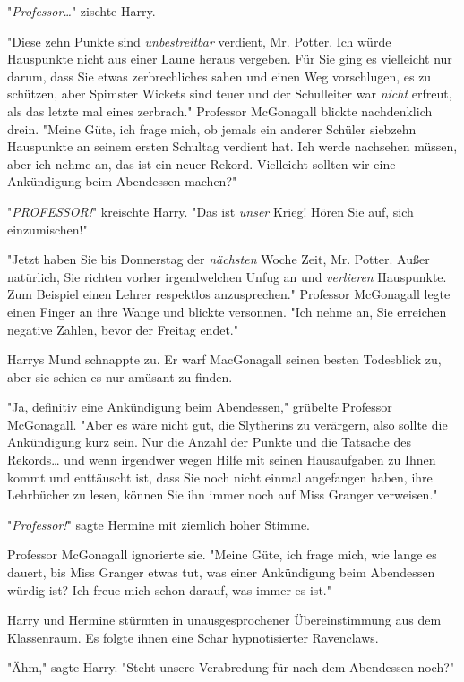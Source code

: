 {"\emph{Professor…}" zischte Harry.

"Diese zehn Punkte sind \emph{unbestreitbar} verdient, Mr. Potter. Ich würde Hauspunkte nicht aus einer Laune heraus vergeben. Für Sie ging es vielleicht nur darum, dass Sie etwas zerbrechliches sahen und einen Weg vorschlugen, es zu schützen, aber Spimster Wickets sind teuer und der Schulleiter war \emph{nicht} erfreut, als das letzte mal eines zerbrach." Professor McGonagall blickte nachdenklich drein. "Meine Güte, ich frage mich, ob jemals ein anderer Schüler siebzehn Hauspunkte an seinem ersten Schultag verdient hat. Ich werde nachsehen müssen, aber ich nehme an, das ist ein neuer Rekord. Vielleicht sollten wir eine Ankündigung beim Abendessen machen?"

"\emph{PROFESSOR!}" kreischte Harry. "Das ist \emph{unser} Krieg! Hören Sie auf, sich einzumischen!"

"Jetzt haben Sie bis Donnerstag der \emph{nächsten} Woche Zeit, Mr. Potter. Außer natürlich, Sie richten vorher irgendwelchen Unfug an und \emph{verlieren} Hauspunkte. Zum Beispiel einen Lehrer respektlos anzusprechen." Professor McGonagall legte einen Finger an ihre Wange und blickte versonnen. "Ich nehme an, Sie erreichen negative Zahlen, bevor der Freitag endet."

Harrys Mund schnappte zu. Er warf MacGonagall seinen besten Todesblick zu, aber sie schien es nur amüsant zu finden.

"Ja, definitiv eine Ankündigung beim Abendessen," grübelte Professor McGonagall. "Aber es wäre nicht gut, die Slytherins zu verärgern, also sollte die Ankündigung kurz sein. Nur die Anzahl der Punkte und die Tatsache des Rekords… und wenn irgendwer wegen Hilfe mit seinen Hausaufgaben zu Ihnen kommt und enttäuscht ist, dass Sie noch nicht einmal angefangen haben, ihre Lehrbücher zu lesen, können Sie ihn immer noch auf Miss Granger verweisen."

"\emph{Professor!}" sagte Hermine mit ziemlich hoher Stimme.

Professor McGonagall ignorierte sie. "Meine Güte, ich frage mich, wie lange es dauert, bis Miss Granger etwas tut, was einer Ankündigung beim Abendessen würdig ist? Ich freue mich schon darauf, was immer es ist."

Harry und Hermine stürmten in unausgesprochener Übereinstimmung aus dem Klassenraum. Es folgte ihnen eine Schar hypnotisierter Ravenclaws.

"Ähm," sagte Harry. "Steht unsere Verabredung für nach dem Abendessen noch?"

}
